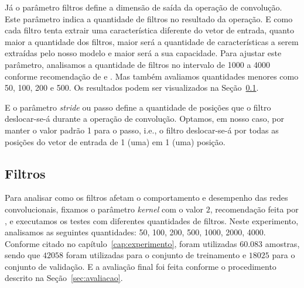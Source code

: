 Já o parâmetro filtros define a dimensão de saída da operação de convolução. Este parâmetro indica a quantidade de filtros no resultado da operação. E como cada filtro tenta extrair uma característica diferente do vetor de entrada, quanto maior a quantidade dos filtros, maior será a quantidade de características a serem extraídas pelo nosso modelo e maior será a sua capacidade. Para ajustar este parâmetro, analisamos a quantidade de filtros no intervalo de 1000 a 4000 conforme recomendação de \cite{feng-2015} e \cite{tan-lstm-qa}. Mas também avaliamos quantidades menores como 50, 100, 200 e 500. Os resultados podem ser visualizados na Seção~\ref{sec:ape-filtros}.


E o parâmetro \textit{stride} ou passo define a quantidade de posições que o filtro deslocar-se-á durante a operação de convolução. Optamos, em nosso caso, por manter o valor padrão 1 para o passo, i.e., o filtro deslocar-se-á por todas as posições do vetor de entrada de 1 (uma) em 1 (uma) posição.




\subsection{Filtros}
\label{sec:ape-filtros}

Para analisar como os filtros afetam o comportamento e desempenho das redes convolucionais, fixamos o parâmetro \textit{kernel} com o valor $2$, recomendação feita por \cite{tan-lstm-qa}, e executamos os testes com diferentes quantidades de filtros. Neste experimento, analisamos as seguintes quantidades: 50, 100, 200, 500, 1000, 2000, 4000. Conforme citado no capítulo~\ref{cap:experimento}, foram utilizadas $60.083$ amostras, sendo que $42058$ foram utilizadas para o conjunto de treinamento e $18025$ para o conjunto de validação. E a avaliação final foi feita conforme o procedimento descrito na Seção~\ref{sec:avaliacao}.



